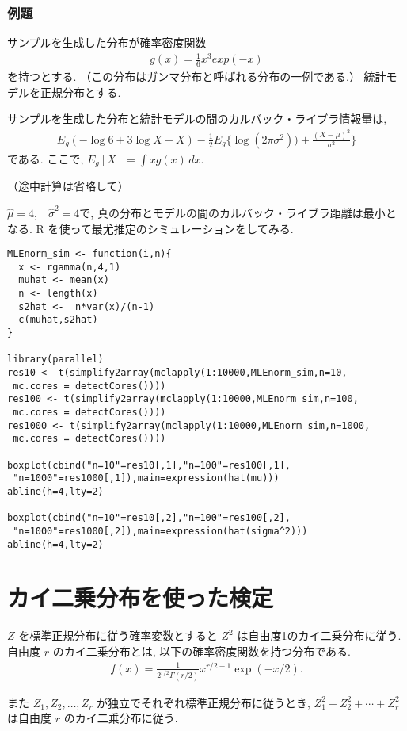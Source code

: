 \documentclass{jarticle}
\begin{document}
\subsubsection{例題}
サンプルを生成した分布が確率密度関数
\begin{align}
g(x) = \frac{1}{6}x^3 exp(-x)
\end{align}
を持つとする. （この分布はガンマ分布と呼ばれる分布の一例である.）
統計モデルを正規分布とする. 

サンプルを生成した分布と統計モデルの間のカルバック・ライブラ情報量は, 
 \begin{align}
 E_g (-\log6+3\log X-X)-\frac{1}{2}E_g\{\log(2\pi \sigma^2)) + \frac{(X-\mu)^2}{\sigma^2}\}
 \end{align}
 である. ここで, $E_g[X] = \int xg(x)\, dx$.
 
（途中計算は省略して）

$\hat \mu=4$,　$\hat \sigma^2=4$で, 真の分布とモデルの間のカルバック・ライブラ距離は最小となる. 
R を使って最尤推定のシミュレーションをしてみる.
\begin{verbatim}
MLEnorm_sim <- function(i,n){
  x <- rgamma(n,4,1)
  muhat <- mean(x)
  n <- length(x)
  s2hat <-  n*var(x)/(n-1)
  c(muhat,s2hat)
}

library(parallel)
res10 <- t(simplify2array(mclapply(1:10000,MLEnorm_sim,n=10,
 mc.cores = detectCores())))
res100 <- t(simplify2array(mclapply(1:10000,MLEnorm_sim,n=100,
 mc.cores = detectCores())))
res1000 <- t(simplify2array(mclapply(1:10000,MLEnorm_sim,n=1000,
 mc.cores = detectCores())))

boxplot(cbind("n=10"=res10[,1],"n=100"=res100[,1],
 "n=1000"=res1000[,1]),main=expression(hat(mu)))
abline(h=4,lty=2)

boxplot(cbind("n=10"=res10[,2],"n=100"=res100[,2],
 "n=1000"=res1000[,2]),main=expression(hat(sigma^2)))
abline(h=4,lty=2)
\end{verbatim}

\section{カイ二乗分布を使った検定}

$Z$ を標準正規分布に従う確率変数とすると $Z^2$ は自由度1のカイ二乗分布に従う. 
自由度 $r$ のカイ二乗分布とは, 以下の確率密度関数を持つ分布である. 
\begin{align}
f(x) = \frac{1}{2^{r/2}\Gamma(r/2)}x^{r/2-1}\exp(-x/2).
\end{align}

また $Z_1, Z_2, \ldots, Z_r$ が独立でそれぞれ標準正規分布に従うとき, $Z_1^2+ Z_2^2+ \cdots +Z_r^2$ は自由度 $r$ のカイ二乗分布に従う. 
\end{document}
